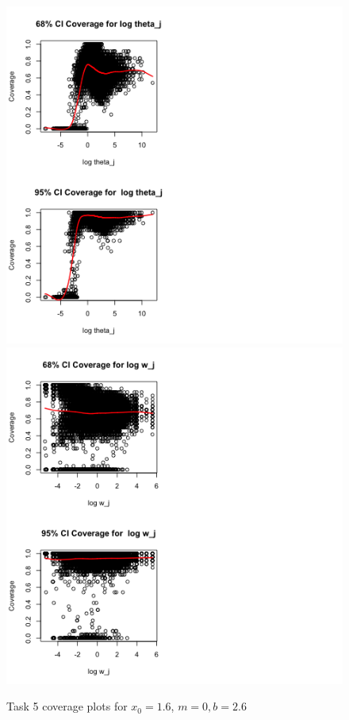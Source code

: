 \documentclass[paper=a4, fontsize=11pt]{scrartcl}
\begin{document}
\begin{figure}[h!]
  \caption{Task 5 coverage plots for $x_0 = 1.6$, $m = 0, b = 2.6$}
  \centering
	\includegraphics[scale=1, trim = 80 0 150 0]{keskici_wxiao_ps2_task5_plot7.png}
		\includegraphics[scale=1, trim = 100 0 300 0]{keskici_wxiao_ps2_task5_plot8.png}

\end{figure}
\end{document}
